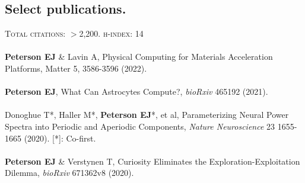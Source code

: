 \documentclass[margin,line]{res}
\begin{document}
\begin{resume}
\section{\sc Select publications.}
\textsc{Total citations}: $>$2,200. \textsc{h-index}: 14
\\ 
\vspace{-.25cm} 
\\
\textbf{Peterson EJ} \& Lavin A, Physical Computing for Materials Acceleration Platforms, Matter 5, 3586-3596 (2022).
\\ 
\vspace{-.35cm} 
\\
\textbf{Peterson EJ}, What Can Astrocytes Compute?, \emph{bioRxiv} 465192 (2021).
\\ 
\vspace{-.35cm} 
\\
Donoghue T*, Haller M*, \textbf{Peterson EJ}*, et al, Parameterizing Neural Power Spectra into Periodic and Aperiodic Components, \emph{Nature Neuroscience} 23 1655-1665 (2020). [*]: Co-first. 
\\ 
\vspace{-.35cm} 
\\
\textbf{Peterson EJ} \& Verstynen T, Curiosity Eliminates the Exploration-Exploitation Dilemma, \emph{bioRxiv} 671362v8 (2020). 

\end{resume}
\end{document}
